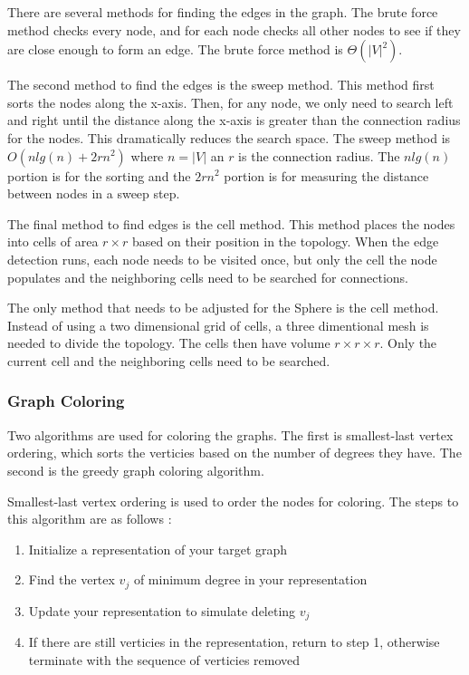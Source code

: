 \documentclass{article}
\begin{document}
        There are several methods for finding the edges in the graph. The brute force method checks every node, and for each node checks all other nodes to see if they are close enough to form an edge. The brute force method is $\Theta\left(|V|^2\right)$.
        \par
        The second method to find the edges is the sweep method. This method first sorts the nodes along the x-axis. Then, for any node, we only need to search left and right until the distance along the x-axis is greater than the connection radius for the nodes. This dramatically reduces the search space. The sweep method is $O\left(n lg(n) + 2rn^2\right)$ where $n = |V|$ an $r$ is the connection radius. The $n lg(n)$ portion is for the sorting and the $2rn^2$ portion is for measuring the distance between nodes in a sweep step.
        \par
        The final method to find edges is the cell method. This method places the nodes into cells of area $r \times r$ based on their position in the topology. When the edge detection runs, each node needs to be visited once, but only the cell the node populates and the neighboring cells need to be searched for connections.
        \par
        The only method that needs to be adjusted for the Sphere is the cell method. Instead of using a two dimensional grid of cells, a three dimentional mesh is needed to divide the topology. The cells then have volume $r \times r \times r$. Only the current cell and the neighboring cells need to be searched.

        \subsubsection{Graph Coloring}
        Two algorithms are used for coloring the graphs. The first is smallest-last vertex ordering, which sorts the verticies based on the number of degrees they have. The second is the greedy graph coloring algorithm.
        \par
        Smallest-last vertex ordering is used to order the nodes for coloring. The steps to this algorithm are as follows \cite{slv}:

        \begin{enumerate}
            \item Initialize a representation of your target graph
            \item Find the vertex $v_j$ of minimum degree in your representation
            \item Update your representation to simulate deleting $v_j$
            \item If there are still verticies in the representation, return to step 1, otherwise terminate with the sequence of verticies removed
        \end{enumerate}
\end{document}
